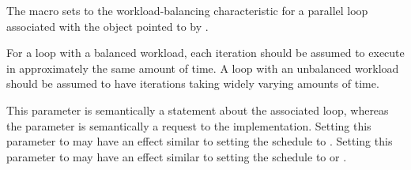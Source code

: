 \pnum
The
macro sets to
the workload-balancing characteristic
for a parallel loop associated with the object pointed to by
.

\pnum
For a loop with a balanced workload,
each iteration should be assumed to execute
in approximately the same amount of time.
A loop with an unbalanced workload
should be assumed to have iterations
taking widely varying amounts of time.

\begin{note}
This parameter is semantically a statement about the associated loop,
whereas the
parameter is semantically a request to the implementation.
Setting this parameter to
may have an effect similar to setting the schedule to
.
Setting this parameter to
may have an effect similar to setting the schedule to
or
.
\end{note}
